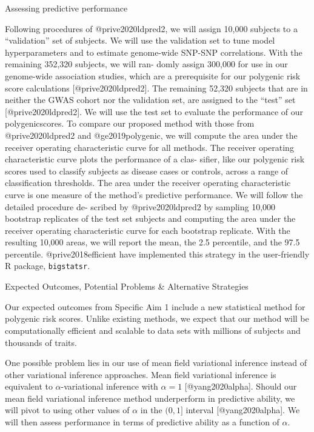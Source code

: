 \documentclass[
  letterpaper,
  DIV=11,
  numbers=noendperiod]{scrartcl}
\begin{document}
Assessing predictive performance

Following procedures of @prive2020ldpred2, we will assign 10,000
subjects to a ``validation'' set of subjects. We will use the validation
set to tune model hyperparameters and to estimate genome-wide SNP-SNP
correlations. With the remaining 352,320 subjects, we will ran- domly
assign 300,000 for use in our genome-wide association studies, which are
a prerequisite for our polygenic risk score calculations
{[}@prive2020ldpred2{]}. The remaining 52,320 subjects that are in
neither the GWAS cohort nor the validation set, are assigned to the
``test'' set {[}@prive2020ldpred2{]}. We will use the test set to
evaluate the performance of our polygenicscores. To compare our proposed
method with those from @prive2020ldpred2 and @ge2019polygenic, we will
compute the area under the receiver operating characteristic curve for
all methods. The receiver operating characteristic curve plots the
performance of a clas- sifier, like our polygenic risk scores used to
classify subjects as disease cases or controls, across a range of
classification thresholds. The area under the receiver operating
characteristic curve is one measure of the method's predictive
performance. We will follow the detailed procedure de- scribed by
@prive2020ldpred2 by sampling 10,000 bootstrap replicates of the test
set subjects and computing the area under the receiver operating
characteristic curve for each bootstrap replicate. With the resulting
10,000 areas, we will report the mean, the 2.5 percentile, and the 97.5
percentile. @prive2018efficient have implemented this strategy in the
user-friendly R package, \texttt{bigstatsr}.

Expected Outcomes, Potential Problems \& Alternative Strategies

Our expected outcomes from Specific Aim 1 include a new statistical
method for polygenic risk scores. Unlike existing methods, we expect
that our method will be computationally efficient and scalable to data
sets with millions of subjects and thousands of traits.

One possible problem lies in our use of mean field variational inference
instead of other variational inference approaches. Mean field
variational inference is equivalent to \(\alpha\)-variational inference
with \(\alpha = 1\) {[}@yang2020alpha{]}. Should our mean field
variational inference method underperform in predictive ability, we will
pivot to using other values of \(\alpha\) in the \((0, 1]\) interval
{[}@yang2020alpha{]}. We will then assess performance in terms of
predictive ability as a function of \(\alpha\).
\end{document}
